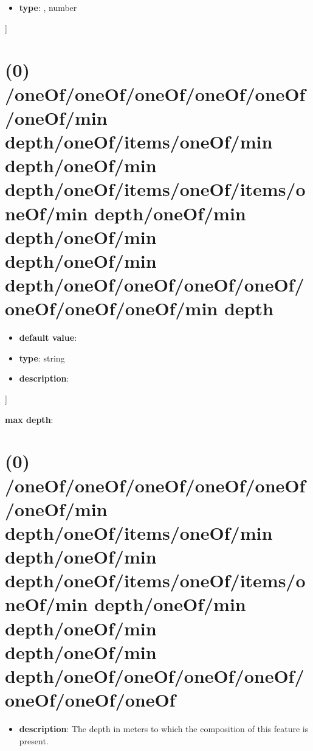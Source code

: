 \begin{itemize}[leftmargin=5em]\item {\bf type}: , number\end{itemize}]\section{(0) /oneOf/oneOf/oneOf/oneOf/oneOf/oneOf/min depth/oneOf/items/oneOf/min depth/oneOf/min depth/oneOf/items/oneOf/items/oneOf/min depth/oneOf/min depth/oneOf/min depth/oneOf/min depth/oneOf/oneOf/oneOf/oneOf/oneOf/oneOf/oneOf/min depth}
\begin{itemize}[leftmargin=0em]\item {\bf default value}: 
\item {\bf type}: string
\item {\bf description}: 
\end{itemize}]\item {\bf max depth}: \section{(0) /oneOf/oneOf/oneOf/oneOf/oneOf/oneOf/min depth/oneOf/items/oneOf/min depth/oneOf/min depth/oneOf/items/oneOf/items/oneOf/min depth/oneOf/min depth/oneOf/min depth/oneOf/min depth/oneOf/oneOf/oneOf/oneOf/oneOf/oneOf/oneOf}
\begin{itemize}[leftmargin=0em]\item {\bf description}: The depth in meters to which the composition of this feature is present.
\end{itemize}

